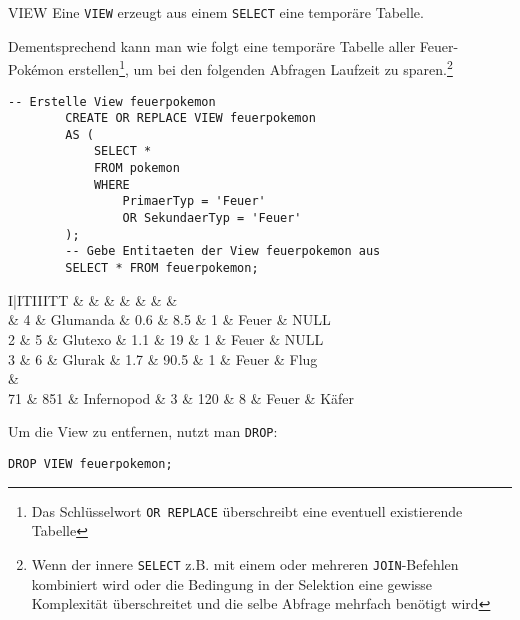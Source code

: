 \begin{sql}{VIEW}
    Eine \texttt{VIEW} erzeugt aus einem \texttt{SELECT} eine temporäre Tabelle.

    Dementsprechend kann man wie folgt eine temporäre Tabelle aller Feuer-Pokémon erstellen\footnote{Das Schlüsselwort \texttt{OR REPLACE} überschreibt eine eventuell existierende Tabelle}, um bei den folgenden Abfragen Laufzeit zu sparen.\footnote{Wenn der innere \texttt{SELECT} z.B. mit einem oder mehreren \texttt{JOIN}-Befehlen kombiniert wird oder die Bedingung in der Selektion eine gewisse Komplexität überschreitet und die selbe Abfrage mehrfach benötigt wird}

    \begin{lstlisting}[language=mysql]
        -- Erstelle View feuerpokemon
        CREATE OR REPLACE VIEW feuerpokemon
        AS (
            SELECT *
            FROM pokemon
            WHERE
                PrimaerTyp = 'Feuer'
                OR SekundaerTyp = 'Feuer'
        );
        -- Gebe Entitaeten der View feuerpokemon aus
        SELECT * FROM feuerpokemon;
    \end{lstlisting}

    \begin{tabular}{I|ITIIITT}
                                   &     &  &  &  &  &  &  \\                          & 4                         & Glumanda                 & 0.6                         & 8.5                         & 1                              & Feuer                          & NULL                             \\
        2                          & 5                         & Glutexo                  & 1.1                         & 19                          & 1                              & Feuer                          & NULL                             \\
        3                          & 6                         & Glurak                   & 1.7                         & 90.5                        & 1                              & Feuer                          & Flug                             \\
         &                                                                                                                                                                                              \\
        71                         & 851                       & Infernopod               & 3                           & 120                         & 8                              & Feuer                          & Käfer                            \\
    \end{tabular}
    \vspace{1em}

    Um die View zu entfernen, nutzt man \texttt{DROP}:

    \begin{lstlisting}[language=mysql]
        DROP VIEW feuerpokemon;
    \end{lstlisting}
\end{sql}
